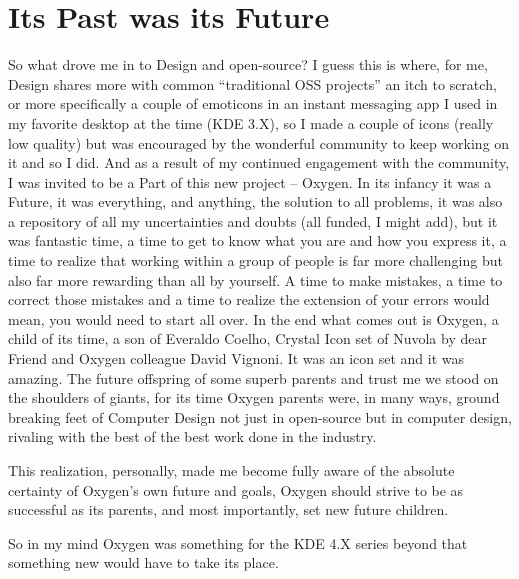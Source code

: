 \section*{Its Past was its Future}
So what drove me in to Design and open-source? 
I guess this is where, for me, Design shares more with common “traditional OSS projects” an itch to scratch, or more specifically a couple of emoticons in an instant messaging app I used in my favorite desktop at the time (KDE 3.X), so I made a couple of icons (really low quality) but was encouraged by the wonderful community to keep working on it and so I did. And as a result of my continued engagement with the community, I was invited to be a Part of this new project – Oxygen. In its infancy it was a Future, it was everything, and anything, the solution to all problems, it was also a repository of all my uncertainties and doubts (all funded, I might add), but it was fantastic time, a time to get to know what you are and how you express it, a time to realize that working within a group of people is far more challenging but also far more rewarding than all by yourself. A time to make mistakes, a time to correct those mistakes and a time to realize the extension of your errors would mean, you would need to start all over.
In the end what comes out is Oxygen, a child of its time, a son of Everaldo Coelho, Crystal Icon set of Nuvola by dear Friend and Oxygen colleague David Vignoni. It was an icon set and it was amazing.
The future offspring of some superb parents and trust me we stood on the shoulders of giants, for its time Oxygen parents were, in many ways, ground breaking feet of Computer Design not just in open-source but in computer design, rivaling with the best of the best work done in the industry. 

This realization, personally, made me become fully aware of  the absolute certainty of Oxygen's own future and goals, Oxygen should strive to be as successful as its parents, and most importantly, set new future children.

So in my mind Oxygen was something for the KDE 4.X series beyond that something new would have to take its place.  


